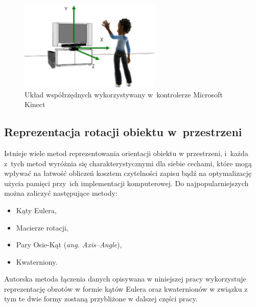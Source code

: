 \begin{savenotes}
	\begin{figure}
		\centering
		\includegraphics[width=0.6\textwidth]{images/skeletonSpace.png}
		\caption[Układ współrzędnych wykorzystywany w~kontrolerze Microsoft Kinect]{Układ współrzędnych wykorzystywany w~kontrolerze Microsoft Kinect}
		\label{fig:characteristics:kinect:space}
	\end{figure}
\end{savenotes}
																											
																									
\subsection{Reprezentacja rotacji obiektu w~przestrzeni}\label{chap:orientstionRep}
Istnieje wiele metod reprezentowania orientacji obiektu w przestrzeni, i~każda z~tych metod wyróżnia się charakterystycznymi dla siebie cechami, które mogą wpływać na łatwość obliczeń kosztem czytelności zapisu bądź na optymalizację użycia pamięci przy~ich implementacji komputerowej. Do najpopularniejszych można zaliczyć następujące metody:
																										
\begin{itemize}
	\item Kąty Eulera,
	\item Macierze rotacji,
	\item Pary Osie-Kąt (\emph{ang. Axis--Angle}),
	\item Kwaterniony.
\end{itemize} 
				
Autorska metoda łączenia danych opisywana w niniejszej pracy wykorzystuje reprezentację obrotów w formie kątów Eulera oraz kwaternionów w związku z tym te dwie formy zostaną przybliżone w dalszej części pracy.
																											
